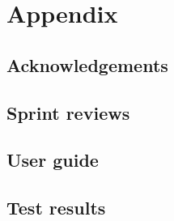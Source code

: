 \section{Appendix}

\subsection{Acknowledgements}
\subsection{Sprint reviews}
\subsection{User guide}
\subsection{Test results}